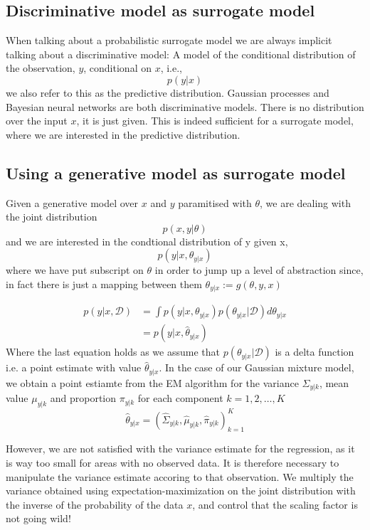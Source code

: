 \subsection{Discriminative model as surrogate model}
When talking about a probabilistic surrogate model we are always implicit talking about a
discriminative model: A model of the conditional distribution of the observation, $y$, 
conditional on $x$, i.e., 
$$p(y|x)$$
we also refer to this as the predictive distribution. Gaussian processes and Bayesian neural networks
are both discriminative models. There is no distribution over the input $x$, it is just given. 
This is indeed sufficient for a surrogate model, where we are interested in the predictive distribution. 

\subsection{Using a generative model as surrogate model}

Given a generative model over $x$ and $y$ paramitised with $\theta$, we are dealing with the joint distribution
$$p(x,y|\theta)$$
and we are interested in the condtional distribution of y given x, 
$$p(y|x, \theta_{y|x})$$
where we have put subscript on $\theta$ in order to jump up a level of abstraction since, 
in fact there is just a mapping between them $\theta_{y|x} := g(\theta, y, x)$ 




\begin{align*}
    p(y|x, \mathcal{D}) &= \int p(y|x,\theta_{y|x})p(\theta_{y|x}|\mathcal{D}) d\theta_{y|x}  \\
    &=  p(y|x,\hat \theta_{y|x})
\end{align*}
Where the last equation holds as we assume that $p(\theta_{y|x}|\mathcal{D})$ is a delta function
i.e. a point estimate with value $\hat \theta_{y|x}$. In the case of our Gaussian mixture model, 
we obtain a point estiamte from the EM algorithm for the variance $\Sigma_{y|k}$, mean value $\mu_{y|k}$ and proportion $\pi_{y|k}$
for each component $k = 1,2, \dots, K$
$$\hat \theta_{y|x} = (\hat\Sigma_{y|k}, \hat\mu_{y|k}, \hat\pi_{y|k})_{k=1}^K$$

However, we are not satisfied with the variance estimate for the regression, as it is way too small for areas with
no observed data. It is therefore necessary to manipulate the variance estimate accoring to that observation. 
We multiply the variance obtained using expectation-maximization on the joint distribution with the
inverse of the probability of the data $x$, and control that the scaling factor is not going wild!

